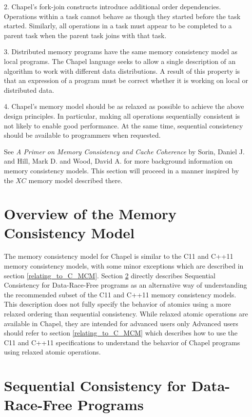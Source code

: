 2. Chapel's fork-join constructs introduce additional order dependencies.
   Operations within a task cannot behave as though they started before the
   task started. Similarly, all operations in a task must appear to be
   completed to a parent task when the parent task joins with that task.

3. Distributed memory programs have the same memory consistency model as local
   programs. The Chapel language seeks to allow a single description of an
   algorithm to work with different data distributions. A result of this
   property is that an expression of a program must be correct whether it is
   working on local or distributed data.

4. Chapel's memory model should be as relaxed as possible to achieve the above
   design principles. In particular, making all operations sequentially
   consistent is not likely to enable good performance. At the same time,
   sequential consistency should be available to programmers when requested.

See \textit{A Primer on Memory Consistency and Cache Coherence} by Sorin,
Daniel J. and Hill, Mark D. and Wood, David A. for more background information
on memory consistency models. This section will proceed in a manner inspired by
the $XC$ memory model described there.

\section{Overview of the Memory Consistency Model}

The memory consistency model for Chapel is similar to the C11 and C++11 memory
consistency models, with some minor exceptions which are described in section
\ref{relating_to_C_MCM}. Section \ref{SC_for_DRF} directly describes Sequential
Consistency for Data-Race-Free programs as an alternative way of understanding
the recommended subset of the C11 and C++11 memory consistency models. This
description does not fully specify the behavior of atomics using a more relaxed
ordering than sequential consistency. While relaxed atomic operations are
available in Chapel, they are intended for advanced users only
Advanced users should refer to
section \ref{relating_to_C_MCM} which describes how to use the C11 and C++11
specifications to understand the behavior of Chapel programs using relaxed
atomic operations.

\section{Sequential Consistency for Data-Race-Free Programs}
\label{SC_for_DRF}

